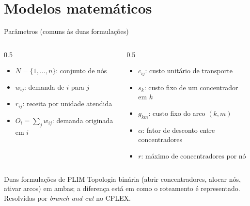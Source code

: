 \documentclass[aspectratio=169, 10pt]{beamer}
\begin{document}
\section{Modelos matemáticos}

\begin{frame}{Parâmetros (comuns às duas formulações)}
  \begin{columns}[T]
    \begin{column}{0.5\textwidth}
      \small
      \begin{itemize}
        \item $N=\{1,\dots,n\}$: conjunto de nós
        \item $w_{ij}$: demanda de $i$ para $j$
        \item $r_{ij}$: receita por unidade atendida
        \item $O_i=\sum_j w_{ij}$: demanda originada em $i$
      \end{itemize}
    \end{column}
    \begin{column}{0.5\textwidth}
      \small
      \begin{itemize}
        \item $c_{ij}$: custo unitário de transporte
        \item $s_k$: custo fixo de um concentrador em $k$
        \item $g_{km}$: custo fixo do arco $(k,m)$
        \item $\alpha$: fator de desconto entre concentradores
        \item $r$: máximo de concentradores por nó
      \end{itemize}
    \end{column}
  \end{columns}

  \vspace{0.5cm}
  \begin{alertblock}{Duas formulações de PLIM}
    \small
    Topologia binária (abrir concentradores, alocar nós, ativar arcos) em ambas; a diferença está em como o \alert{roteamento} é representado. Resolvidas por \textit{branch-and-cut} no CPLEX.
  \end{alertblock}
\end{frame}
\end{document}
